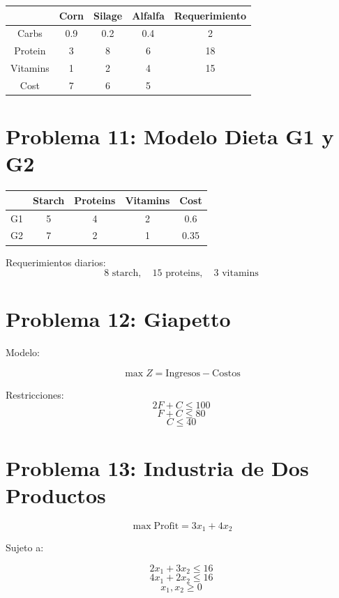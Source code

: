 \documentclass[12pt]{article}
\begin{document}
\begin{center}
\begin{tabular}{c|ccc|c}
\toprule
 & Corn & Silage & Alfalfa & Requerimiento \\
\midrule
Carbs & 0.9 & 0.2 & 0.4 & 2 \\
Protein & 3 & 8 & 6 & 18 \\
Vitamins & 1 & 2 & 4 & 15 \\
Cost & 7 & 6 & 5 & \\
\bottomrule
\end{tabular}
\end{center}

\section*{Problema 11: Modelo Dieta G1 y G2}

\begin{center}
\begin{tabular}{c|ccc|c}
\toprule
 & Starch & Proteins & Vitamins & Cost \\
\midrule
G1 & 5 & 4 & 2 & 0.6 \\
G2 & 7 & 2 & 1 & 0.35 \\
\bottomrule
\end{tabular}
\end{center}

Requerimientos diarios:
\[
8 \text{ starch}, \quad 15 \text{ proteins}, \quad 3 \text{ vitamins}
\]

\section*{Problema 12: Giapetto}

Modelo:

\[
\max Z = \text{Ingresos} - \text{Costos}
\]

Restricciones:
\[
2F + C \leq 100
\]
\[
F + C \leq 80
\]
\[
C \leq 40
\]

\section*{Problema 13: Industria de Dos Productos}

\[
\max \text{Profit} = 3x_1 + 4x_2
\]

Sujeto a:

\[
2x_1 + 3x_2 \leq 16
\]
\[
4x_1 + 2x_2 \leq 16
\]
\[
x_1, x_2 \geq 0
\]
\end{document}
